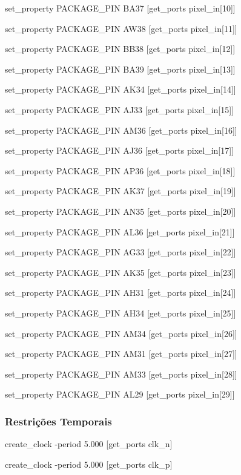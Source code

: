 set\_property PACKAGE\_PIN BA37 [get\_ports {pixel\_in[10]}]

set\_property PACKAGE\_PIN AW38 [get\_ports {pixel\_in[11]}]

set\_property PACKAGE\_PIN BB38 [get\_ports {pixel\_in[12]}]

set\_property PACKAGE\_PIN BA39 [get\_ports {pixel\_in[13]}]

set\_property PACKAGE\_PIN AK34 [get\_ports {pixel\_in[14]}]

set\_property PACKAGE\_PIN AJ33 [get\_ports {pixel\_in[15]}]

set\_property PACKAGE\_PIN AM36 [get\_ports {pixel\_in[16]}]

set\_property PACKAGE\_PIN AJ36 [get\_ports {pixel\_in[17]}]

set\_property PACKAGE\_PIN AP36 [get\_ports {pixel\_in[18]}]

set\_property PACKAGE\_PIN AK37 [get\_ports {pixel\_in[19]}]

set\_property PACKAGE\_PIN AN35 [get\_ports {pixel\_in[20]}]

set\_property PACKAGE\_PIN AL36 [get\_ports {pixel\_in[21]}]

set\_property PACKAGE\_PIN AG33 [get\_ports {pixel\_in[22]}]

set\_property PACKAGE\_PIN AK35 [get\_ports {pixel\_in[23]}]

set\_property PACKAGE\_PIN AH31 [get\_ports {pixel\_in[24]}]

set\_property PACKAGE\_PIN AH34 [get\_ports {pixel\_in[25]}]

set\_property PACKAGE\_PIN AM34 [get\_ports {pixel\_in[26]}]

set\_property PACKAGE\_PIN AM31 [get\_ports {pixel\_in[27]}]

set\_property PACKAGE\_PIN AM33 [get\_ports {pixel\_in[28]}]

set\_property PACKAGE\_PIN AL29 [get\_ports {pixel\_in[29]}]

\subsubsection{Restrições Temporais} \label{ap2:planB_timing_cnstrs}

create\_clock -period 5.000 [get\_ports clk\_n]

create\_clock -period 5.000 [get\_ports clk\_p]
